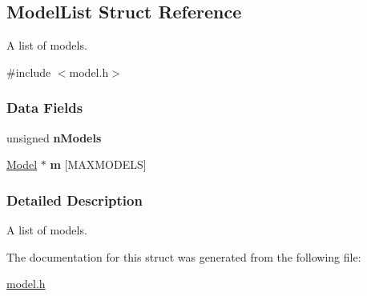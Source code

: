 \hypertarget{struct_model_list}{\subsection{Model\+List Struct Reference}
\label{struct_model_list}
}


A list of models.  




{\ttfamily \#include $<$model.\+h$>$}

\subsubsection*{Data Fields}
\begin{DoxyCompactItemize}
\item 
\hypertarget{struct_model_list_a58301ab01d8eef6ac4d0a486f89fcc08}{unsigned {\bfseries n\+Models}}\label{struct_model_list_a58301ab01d8eef6ac4d0a486f89fcc08}

\item 
\hypertarget{struct_model_list_a05ff4f000fae734e434a27b4fe016c82}{\hyperlink{struct_model}{Model} $\ast$ {\bfseries m} \mbox{[}M\+A\+X\+M\+O\+D\+E\+L\+S\mbox{]}}\label{struct_model_list_a05ff4f000fae734e434a27b4fe016c82}

\end{DoxyCompactItemize}


\subsubsection{Detailed Description}
A list of models. 

The documentation for this struct was generated from the following file\+:\begin{DoxyCompactItemize}
\item 
\hyperlink{model_8h}{model.\+h}\end{DoxyCompactItemize}

